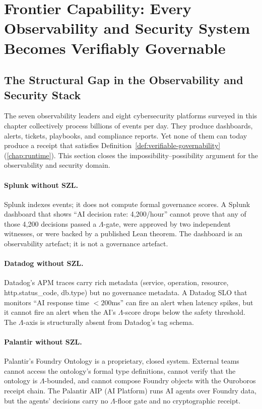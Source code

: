 \section{Frontier Capability: Every Observability and Security System Becomes Verifiably Governable}
\label{sec:obs-sec-frontier}

\subsection{The Structural Gap in the Observability and Security Stack}
\label{ssec:obs-sec-gap}

The seven observability leaders and eight cybersecurity platforms surveyed
in this chapter collectively process billions of events per day.  They
produce dashboards, alerts, tickets, playbooks, and compliance reports.
Yet none of them can today produce a receipt that satisfies
Definition~\ref{def:verifiable-governability} (\cref{chap:runtime}).
This section closes the impossibility--possibility argument for the
observability and security domain.

\paragraph{Splunk without SZL.}
Splunk indexes events; it does not compute formal governance scores.  A
Splunk dashboard that shows ``AI decision rate: 4,200/hour'' cannot prove
that any of those 4,200 decisions passed a $\Lambda$-gate, were approved
by two independent witnesses, or were backed by a published Lean theorem.
The dashboard is an observability artefact; it is not a governance artefact.

\paragraph{Datadog without SZL.}
Datadog's APM traces carry rich metadata (service, operation, resource,
http.status\_code, db.type) but no governance metadata.  A Datadog SLO
that monitors ``AI response time $< 200$ms'' can fire an alert when latency
spikes, but it cannot fire an alert when the AI's $\Lambda$-score drops
below the safety threshold.  The $\Lambda$-axis is structurally absent
from Datadog's tag schema.

\paragraph{Palantir without SZL.}
Palantir's Foundry Ontology is a proprietary, closed system.  External teams
cannot access the ontology's formal type definitions, cannot verify that the
ontology is $\Lambda$-bounded, and cannot compose Foundry objects with the
Ouroboros receipt chain.  The Palantir AIP (AI Platform) runs AI agents over
Foundry data, but the agents' decisions carry no $\Lambda$-floor gate and
no cryptographic receipt.

